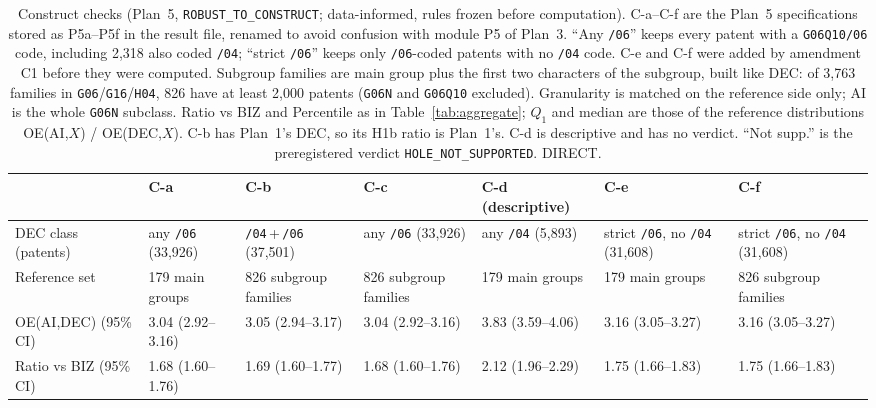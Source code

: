 \begin{table}[tbp]
  \centering
  \caption{Construct checks (Plan~5, \texttt{ROBUST\_\allowbreak TO\_\allowbreak CONSTRUCT}; data-informed, rules frozen before computation). C-a--C-f are the Plan~5 specifications stored as P5a--P5f in the result file, renamed to avoid confusion with module P5 of Plan~3. ``Any \texttt{/06}'' keeps every patent with a \texttt{G06Q10/06} code, including 2,318 also coded \texttt{/04}; ``strict \texttt{/06}'' keeps only \texttt{/06}-coded patents with no \texttt{/04} code. C-e and C-f were added by amendment C1 before they were computed. Subgroup families are main group plus the first two characters of the subgroup, built like DEC: of 3,763 families in \texttt{G06}/\texttt{G16}/\texttt{H04}, 826 have at least 2,000 patents (\texttt{G06N} and \texttt{G06Q10} excluded). Granularity is matched on the reference side only; AI is the whole \texttt{G06N} subclass. Ratio vs BIZ and Percentile as in Table~\ref{tab:aggregate}; $Q_1$ and median are those of the reference distributions OE(AI,$X$) / OE(DEC,$X$). C-b has Plan~1's DEC, so its H1b ratio is Plan~1's. C-d is descriptive and has no verdict. ``Not supp.'' is the preregistered verdict \texttt{HOLE\_\allowbreak NOT\_\allowbreak SUPPORTED}. DIRECT.}
  \label{tab:construct}
  \scriptsize
  \setlength{\tabcolsep}{3pt}
  \begin{tabular}{@{}p{2.1cm}p{2.05cm}p{2.05cm}p{2.05cm}p{2.05cm}p{2.05cm}p{2.05cm}@{}}
    \toprule
    & C-a & C-b & C-c & C-d (descriptive) & C-e & C-f \tabularnewline
    \midrule
    \raggedright DEC class (patents) & \raggedright any \texttt{/06} (33,926) & \raggedright \texttt{/04}\,+\,\texttt{/06} (37,501) & \raggedright any \texttt{/06} (33,926) & \raggedright any \texttt{/04} (5,893) & \raggedright strict \texttt{/06}, no \texttt{/04} (31,608) & \raggedright strict \texttt{/06}, no \texttt{/04} (31,608) \tabularnewline
    \raggedright Reference set & \raggedright 179 main groups & \raggedright 826 subgroup families & \raggedright 826 subgroup families & \raggedright 179 main groups & \raggedright 179 main groups & \raggedright 826 subgroup families \tabularnewline
    \raggedright OE(AI,DEC) (95\% CI) & \raggedright 3.04 (2.92--3.16) & \raggedright 3.05 (2.94--3.17) & \raggedright 3.04 (2.92--3.16) & \raggedright 3.83 (3.59--4.06) & \raggedright 3.16 (3.05--3.27) & \raggedright 3.16 (3.05--3.27) \tabularnewline
    \raggedright Ratio vs BIZ (95\% CI) & \raggedright 1.68 (1.60--1.76) & \raggedright 1.69 (1.60--1.77) & \raggedright 1.68 (1.60--1.76) & \raggedright 2.12 (1.96--2.29) & \raggedright 1.75 (1.66--1.83) & \raggedright 1.75 (1.66--1.83) \tabularnewline

\end{tabular}
\end{table}
